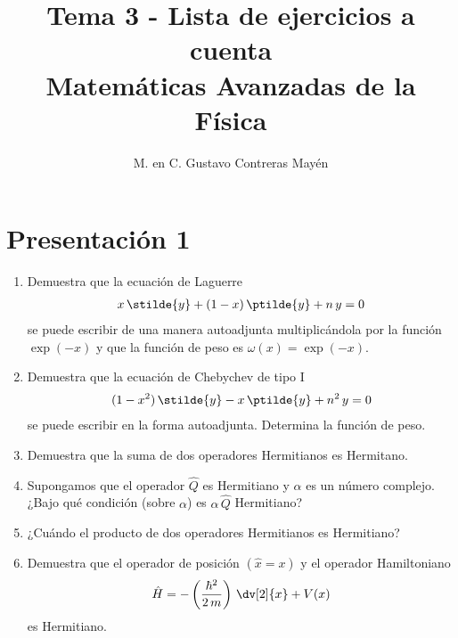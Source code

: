 
\title{Tema 3 - Lista de ejercicios a cuenta\\ \large{Matemáticas Avanzadas de la Física}\vspace{-3ex}}
\author{M. en C. Gustavo Contreras Mayén}
\date{ }

\vspace{-4cm}
\maketitle
\fontsize{14}{14}\selectfont
\section{Presentación 1}
\begin{enumerate}
    \item Demuestra que la ecuación de Laguerre
\begin{align*}
x \, \stilde{y} + (1 - x) \, \ptilde{y} + n \, y = 0
\end{align*}
se puede escribir de una manera autoadjunta multiplicándola por la función $\exp(-x)$ y que la función de peso es $\omega(x) = \exp(-x)$.
\item Demuestra que la ecuación de Chebychev de tipo I
\begin{align*}
(1 -x^{2}) \, \stilde{y} - x \, \ptilde{y} + n^{2} \, y = 0
\end{align*}
se puede escribir en la forma autoadjunta. Determina la función de peso.
\item Demuestra que la suma de dos operadores Hermitianos es Hermitano.
\item Supongamos que el operador $\hat{Q}$ es Hermitiano y $\alpha$ es un número complejo. ¿Bajo qué condición (sobre $\alpha$) es $\alpha \, \hat{Q}$ Hermitiano?
\item ¿Cuándo el producto de dos operadores Hermitianos es Hermitiano?
\item Demuestra que el operador de posición $(\hat{x} = x)$ y el operador Hamiltoniano
\begin{align*}
\hat{H} = - \left( \dfrac{\hbar^{2}}{2 \, m} \right) \, \dv[2]{x} + V(x)
\end{align*}
es Hermitiano.
\end{enumerate}
